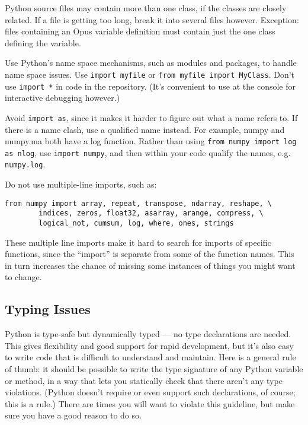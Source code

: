 Python source files may contain more than one class, if the classes are
closely related.  If a file is getting too long, break it into several
files however.  Exception: files containing an Opus variable definition
must contain just the one class defining the variable.

Use Python's name space mechanisms, such as modules and packages, to handle
name space issues.  Use \verb|import myfile| or
\verb|from myfile import MyClass|.  Don't use \verb|import *| in code in
the repository.  (It's convenient to use at the console for interactive debugging
however.)

Avoid \verb|import as|, since it makes it harder to figure out what a name
refers to.  If there is a name clash, use a qualified name
instead.  For example, numpy and numpy.ma both have a log
function.  Rather than
using \verb|from numpy import log as nlog|,
use \verb|import numpy|, and then within your code qualify the names, e.g.
\verb|numpy.log|.

Do not use multiple-line imports, such as:

\begin{verbatim}
from numpy import array, repeat, transpose, ndarray, reshape, \
        indices, zeros, float32, asarray, arange, compress, \
        logical_not, cumsum, log, where, ones, strings
\end{verbatim}

These multiple line imports make it hard to search for imports of specific functions,
since the ``import'' is separate from some of the function names.  This in turn
increases the chance of missing some instances of things you might want to change.

\subsection{Typing Issues}

Python  is type-safe but dynamically typed --- no type declarations are
needed.  This gives flexibility and good support for rapid development, but
it's also easy to write code that is difficult to understand and maintain.
Here is a general rule of thumb: it should be possible to write the type
signature of any Python variable or method, in a way that lets you
statically check that there aren't any type violations.  (Python doesn't
require or even support such declarations, of course; this is a rule.)
There are times you will want to violate this guideline, but make sure you
have a good reason to do so.

